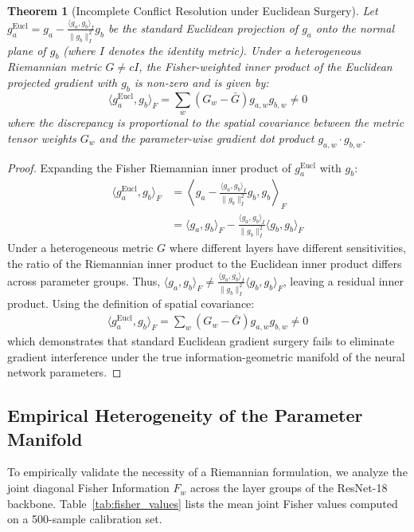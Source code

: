 \documentclass{article}
\theoremstyle{plain}
\newtheorem{theorem}{Theorem}[section]
\theoremstyle{definition}
\theoremstyle{remark}
\begin{document}
\begin{theorem}[Incomplete Conflict Resolution under Euclidean Surgery]
Let $g_a^{\text{Eucl}} = g_a - \frac{\langle g_a, g_b \rangle_I}{\|g_b\|_I^2} g_b$ be the standard Euclidean projection of $g_a$ onto the normal plane of $g_b$ (where $I$ denotes the identity metric). Under a heterogeneous Riemannian metric $G \neq c I$, the Fisher-weighted inner product of the Euclidean projected gradient with $g_b$ is non-zero and is given by:
\begin{equation}
    \langle g_a^{\text{Eucl}}, g_b \rangle_F = \sum_{w} (G_w - \bar{G}) g_{a,w} g_{b,w} \neq 0
\end{equation}
where the discrepancy is proportional to the spatial covariance between the metric tensor weights $G_w$ and the parameter-wise gradient dot product $g_{a,w} \cdot g_{b,w}$.
\end{theorem}
\begin{proof}
Expanding the Fisher Riemannian inner product of $g_a^{\text{Eucl}}$ with $g_b$:
\begin{align*}
    \langle g_a^{\text{Eucl}}, g_b \rangle_F &= \left\langle g_a - \frac{\langle g_a, g_b \rangle_I}{\|g_b\|_I^2} g_b, g_b \right\rangle_F \\
    &= \langle g_a, g_b \rangle_F - \frac{\langle g_a, g_b \rangle_I}{\|g_b\|_I^2} \langle g_b, g_b \rangle_F
\end{align*}
Under a heterogeneous metric $G$ where different layers have different sensitivities, the ratio of the Riemannian inner product to the Euclidean inner product differs across parameter groups. Thus, $\langle g_a, g_b \rangle_F \neq \frac{\langle g_a, g_b \rangle_I}{\|g_b\|_I^2} \langle g_b, g_b \rangle_F$, leaving a residual inner product. Using the definition of spatial covariance:
\begin{align*}
    \langle g_a^{\text{Eucl}}, g_b \rangle_F = \sum_{w} (G_w - \bar{G}) g_{a,w} g_{b,w} \neq 0
\end{align*}
which demonstrates that standard Euclidean gradient surgery fails to eliminate gradient interference under the true information-geometric manifold of the neural network parameters.
\end{proof}

\subsection{Empirical Heterogeneity of the Parameter Manifold}
To empirically validate the necessity of a Riemannian formulation, we analyze the joint diagonal Fisher Information $F_w$ across the layer groups of the ResNet-18 backbone. Table~\ref{tab:fisher_values} lists the mean joint Fisher values computed on a 500-sample calibration set.
\end{document}
